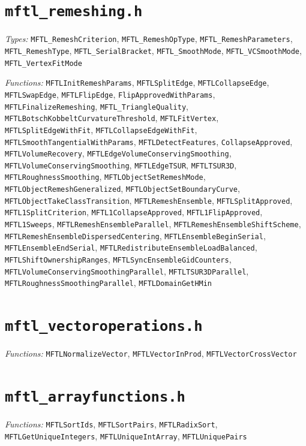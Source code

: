 \section*{\texttt{mftl\_remeshing.h}}
\textit{Types:} \texttt{MFTL\_RemeshCriterion}, \texttt{MFTL\_RemeshOpType}, \texttt{MFTL\_RemeshParameters}, \texttt{MFTL\_RemeshType}, \texttt{MFTL\_SerialBracket}, \texttt{MFTL\_SmoothMode}, \texttt{MFTL\_VCSmoothMode}, \texttt{MFTL\_VertexFitMode}\par
\textit{Functions:} \texttt{MFTLInitRemeshParams}, \texttt{MFTLSplitEdge}, \texttt{MFTLCollapseEdge}, \texttt{MFTLSwapEdge}, \texttt{MFTLFlipEdge}, \texttt{FlipApprovedWithParams}, \texttt{MFTLFinalizeRemeshing}, \texttt{MFTL\_TriangleQuality}, \texttt{MFTLBotschKobbeltCurvatureThreshold}, \texttt{MFTLFitVertex}, \texttt{MFTLSplitEdgeWithFit}, \texttt{MFTLCollapseEdgeWithFit}, \texttt{MFTLSmoothTangentialWithParams}, \texttt{MFTLDetectFeatures}, \texttt{CollapseApproved}, \texttt{MFTLVolumeRecovery}, \texttt{MFTLEdgeVolumeConservingSmoothing}, \texttt{MFTLVolumeConservingSmoothing}, \texttt{MFTLEdgeTSUR}, \texttt{MFTLTSUR3D}, \texttt{MFTLRoughnessSmoothing}, \texttt{MFTLObjectSetRemeshMode}, \texttt{MFTLObjectRemeshGeneralized}, \texttt{MFTLObjectSetBoundaryCurve}, \texttt{MFTLObjectTakeClassTransition}, \texttt{MFTLRemeshEnsemble}, \texttt{MFTLSplitApproved}, \texttt{MFTL1SplitCriterion}, \texttt{MFTL1CollapseApproved}, \texttt{MFTL1FlipApproved}, \texttt{MFTL1Sweeps}, \texttt{MFTLRemeshEnsembleParallel}, \texttt{MFTLRemeshEnsembleShiftScheme}, \texttt{MFTLRemeshEnsembleDispersedCentering}, \texttt{MFTLEnsembleBeginSerial}, \texttt{MFTLEnsembleEndSerial}, \texttt{MFTLRedistributeEnsembleLoadBalanced}, \texttt{MFTLShiftOwnershipRanges}, \texttt{MFTLSyncEnsembleGidCounters}, \texttt{MFTLVolumeConservingSmoothingParallel}, \texttt{MFTLTSUR3DParallel}, \texttt{MFTLRoughnessSmoothingParallel}, \texttt{MFTLDomainGetHMin}\par

\section*{\texttt{mftl\_vectoroperations.h}}
\textit{Functions:} \texttt{MFTLNormalizeVector}, \texttt{MFTLVectorInProd}, \texttt{MFTLVectorCrossVector}\par

\section*{\texttt{mftl\_arrayfunctions.h}}
\textit{Functions:} \texttt{MFTLSortIds}, \texttt{MFTLSortPairs}, \texttt{MFTLRadixSort}, \texttt{MFTLGetUniqueIntegers}, \texttt{MFTLUniqueIntArray}, \texttt{MFTLUniquePairs}\par

